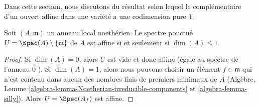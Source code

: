 \noindent
Dans cette section, nous discutons du résultat selon lequel le complémentaire d'un
ouvert affine dans une variété a une codimension pure  $1$.

\begin{lemma}
\label{lemma-affine-punctured-spec}
Soit  $(A, \mathfrak m)$  un anneau local noethérien. Le spectre ponctué  $U = \Spec(A) \setminus \{\mathfrak m\}$  de
 $A$  est affine si et seulement si  $\dim(A) \leq 1$.
\end{lemma}

\begin{proof}
Si  $\dim(A) = 0$, alors  $U$  est vide et donc affine (égale au spectre de
l'anneau  $0$ ). Si  $\dim(A) = 1$, alors nous pouvons choisir un élément
 $f \in \mathfrak m$  qui n'est contenu dans aucun des nombres finis de premiers minimaux
de  $A$  (Algèbre, Lemme  \ref{algebra-lemma-Noetherian-irreducible-components}  et  \ref{algebra-lemma-silly}). Alors  $U = \Spec(A_f)$ 
est affine.


\end{proof}
